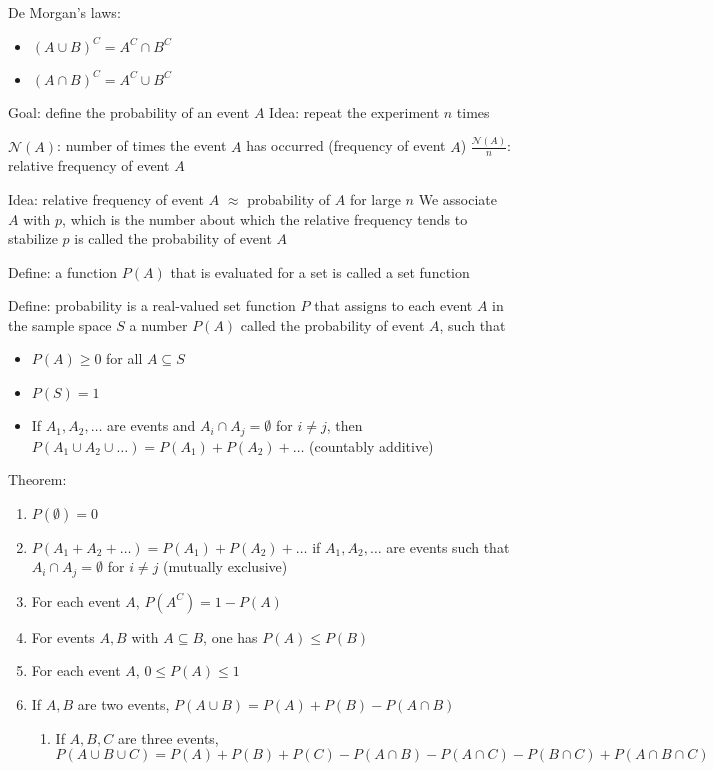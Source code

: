\documentclass{article}
\begin{document}
De Morgan's laws:
\begin{itemize}
    \item $(A\cup B)^C=A^C\cap B^C$
    \item $(A\cap B)^C=A^C\cup B^C$
\end{itemize}

Goal: define the probability of an event $A$
Idea: repeat the experiment $n$ times

$\mathcal{N}(A)$: number of times the event $A$ has occurred (frequency of event $A$)
$\frac{\mathcal{N}(A)}{n}$: relative frequency of event $A$

Idea: relative frequency of event $A$ $\approx$ probability of $A$ for large $n$
We associate $A$ with $p$, which is the number about which the relative frequency tends to stabilize
$p$ is called the probability of event $A$

Define: a function $P(A)$ that is evaluated for a set is called a set function

Define: probability is a real-valued set function $P$ that assigns to each event $A$ in the sample space $S$ a number $P(A)$ called the probability of event $A$, such that
\begin{itemize}
    \item $P(A)\ge0$ for all $A\subseteq S$
    \item $P(S)=1$
    \item If $A_1,A_2,\dots$ are events and $A_i\cap A_j=\emptyset$ for $i\neq j$, then $P(A_1\cup A_2\cup\dots)=P(A_1)+P(A_2)+\dots$ (countably additive)
\end{itemize}

Theorem:
\begin{enumerate}
    \item $P(\emptyset)=0$
    \item $P(A_1+A_2+\dots)=P(A_1)+P(A_2)+\dots$ if $A_1,A_2,\dots$ are events such that $A_i\cap A_j=\emptyset$ for $i\neq j$ (mutually exclusive)
    \item For each event $A$, $P(A^C)=1-P(A)$
    \item For events $A,B$ with $A\subseteq B$, one has $P(A)\leq P(B)$
    \item For each event $A$, $0\leq P(A)\leq1$
    \item If $A,B$ are two events, $P(A\cup B)=P(A)+P(B)-P(A\cap B)$
    \begin{enumerate}
        \item If $A,B,C$ are three events, $P(A\cup B\cup C)=P(A)+P(B)+P(C)-P(A\cap B)-P(A\cap C)-P(B\cap C)+P(A\cap B\cap C)$
    \end{enumerate}
\end{enumerate}
\end{document}
